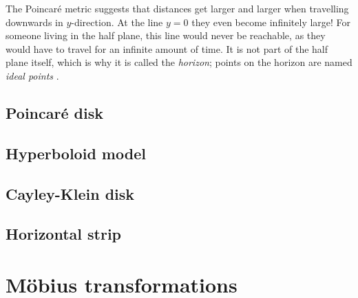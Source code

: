 The Poincaré metric suggests that distances get larger and larger when travelling downwards in \(y\)-direction. At the line \(y=0\) they even become infinitely large! For someone living in the half plane, this line would never be reachable, as they would have to travel for an infinite amount of time. It is not part of the half plane itself, which is why it is called the \emph{horizon}; points on the horizon are named \emph{ideal points} \cite{Needham1997}.

\subsection{Poincaré disk}
\subsection{Hyperboloid model}
\subsection{Cayley-Klein disk}
\subsection{Horizontal strip}

\section{Möbius transformations}
